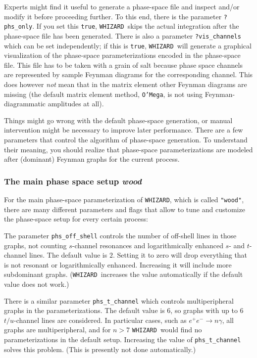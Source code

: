 \documentclass[12pt]{book}
\newcommand{\ttt}[1]{\texttt{#1}}
\newcommand{\whizard}{\ttt{WHIZARD}}
\newcommand{\oMega}{\ttt{O'Mega}}
\begin{document}
Experts might find it useful to generate a phase-space file and inspect and/or
modify it before proceeding further.  To this end, there is the parameter
\verb|?phs_only|.  If you set this \ttt{true}, \whizard\ skips the actual
integration after the phase-space file has been generated.  There is also a
parameter \verb|?vis_channels| which can be set independently; if this is
\ttt{true}, \whizard\ will generate a graphical visualization of the
phase-space parameterizations encoded in the phase-space file. This
file has to be taken with a grain of salt because phase space channels
are represented by sample Feynman diagrams for the corresponding
channel. This does however {\em not} mean that in the matrix element
other Feynman diagrams are missing (the default matrix element method,
\oMega, is not using Feynman-diagrammatic amplitudes at all).

Things might go wrong with the default phase-space generation, or manual
intervention might be necessary to improve later performance.  There are a few
parameters that control the algorithm of phase-space generation.  To
understand their meaning, you should realize that phase-space
parameterizations are modeled after (dominant) Feynman graphs for the current
process.

\subsubsection{The main phase space setup {\em wood}}

For the main phase-space parameterization of \whizard, which is called
\ttt{"wood"}, there are many different parameters and flags that allow
to tune and customize the phase-space setup for every certain process:

The parameter \verb|phs_off_shell| controls the number of off-shell lines in
those graphs, not counting $s$-channel resonances and logarithmically enhanced
$s$- and $t$-channel lines.  The default value is $2$.  Setting it to zero
will drop everything that is not resonant or logarithmically enhanced.
Increasing it will include more subdominant graphs.  (\whizard\ increases the
value automatically if the default value does not work.)

There is a similar parameter \verb|phs_t_channel| which controls
multiperipheral graphs in the parameterizations.  The default value is $6$, so
graphs with up to $6$ $t/u$-channel lines are considered.  In particular
cases, such as $e^+e^-\to n\gamma$, all graphs are multiperipheral, and for
$n>7$ \whizard\ would find no parameterizations in the default setup.
Increasing the value of \verb|phs_t_channel| solves this problem.  (This is
presently not done automatically.)
\end{document}
